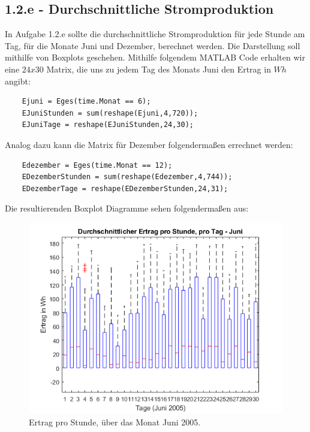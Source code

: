 \documentclass[a4paper,12pt]{article}
\begin{document}
	\subsection{1.2.e - Durchschnittliche Stromproduktion}
	In Aufgabe 1.2.e sollte die durchschnittliche Stromproduktion für jede Stunde am Tag, für die Monate Juni und Dezember, berechnet werden. Die Darstellung soll mithilfe von Boxplots geschehen.\newline
	Mithilfe folgendem MATLAB Code erhalten wir eine $24 x 30$ Matrix, die uns zu jedem Tag des Monats Juni den Ertrag in $Wh$ angibt:
	\begin{lstlisting}
	Ejuni = Eges(time.Monat == 6);
	EJuniStunden = sum(reshape(Ejuni,4,720));
	EJuniTage = reshape(EJuniStunden,24,30);
	\end{lstlisting}
	Analog dazu kann die Matrix für Dezember folgendermaßen errechnet werden:
	\begin{lstlisting}
	Edezember = Eges(time.Monat == 12);
	EDezemberStunden = sum(reshape(Edezember,4,744));
	EDezemberTage = reshape(EDezemberStunden,24,31);
	\end{lstlisting}
	\newpage
	Die resultierenden Boxplot Diagramme sehen folgendermaßen aus:
	\begin{figure}[H]
		\centering
		\includegraphics[width=12cm]{img/results/ErtragProStunde_Juni}
		\caption{Ertrag pro Stunde, über das Monat Juni 2005.}
	\end{figure}
\end{document}

